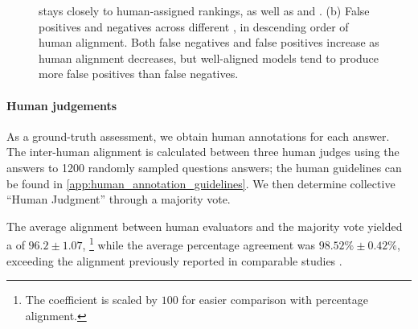 \begin{figure}[t]
{     stays closely to human-assigned rankings, as well as \judge{\gpt} and . 
    (b) False positives and negatives across different \judgemodels, in descending order of human alignment. 
    Both false negatives and false positives increase as human alignment decreases, but well-aligned models tend to produce more false positives than false negatives.
        }\label{fig:ranking_posneg}
\end{figure}

\paragraph{Human judgements} \label{subsec:human_alignment}
As a ground-truth assessment, we obtain human annotations for each \evaluatormodel answer.
The inter-human alignment is calculated between three human judges using the answers to 1200 randomly sampled questions answers; the human guidelines can be found in \cref{app:human_annotation_guidelines}. 
We then determine collective ``Human Judgment'' through a majority vote.
%


The average alignment between human evaluators and the majority vote yielded a \scottspi of $96.2\pm1.07$,%
\footnote{The coefficient is scaled by $100$ for easier comparison with percentage alignment.}
while the average percentage agreement was $98.52\%\pm0.42\%$,  exceeding the alignment previously reported in comparable studies \citep{zeng2024evaluatinglargelanguagemodels}.

